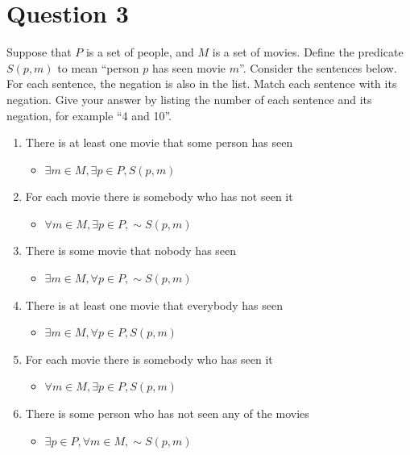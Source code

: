 \documentclass[12pt,a4paper]{article}
\begin{document}
\section{Question 3}

Suppose that $P$ is a set of people, and $M$ is a set of movies. Define the predicate $S(p, m)$ to mean ``person $p$ has seen movie $m$''. Consider the sentences below. For each sentence, the negation is also in the list. Match each sentence with its negation. Give your answer by listing the number of each sentence and its negation, for example ``4 and 10''.

\begin{enumerate}
\item There is at least one movie that some person has seen
	\begin{itemize}
	\item $\exists{m} \in{M}, \exists{p} \in{P}, S(p, m)$ %
	\end{itemize}
\item For each movie there is somebody who has not seen it
	\begin{itemize}
	\item $\forall{m} \in{M}, \exists{p} \in{P}, \sim{S}(p, m)$ %
	\end{itemize}
\item There is some movie that nobody has seen
	\begin{itemize}
	\item $\exists{m} \in{M}, \forall{p} \in{P}, \sim{S}(p, m)$ %
	\end{itemize}
\item There is at least one movie that everybody has seen
	\begin{itemize}
	\item $\exists{m} \in{M}, \forall{p} \in{P}, S(p, m)$ %
	\end{itemize}
\item For each movie there is somebody who has seen it
	\begin{itemize}
	\item $\forall{m} \in{M}, \exists{p} \in{P}, S(p, m)$ %
	\end{itemize}
\item There is some person who has not seen any of the movies
	\begin{itemize}
	\item $\exists{p} \in{P}, \forall{m} \in{M}, \sim{S}(p, m)$ %

\end{itemize}
\end{enumerate}
\end{document}
